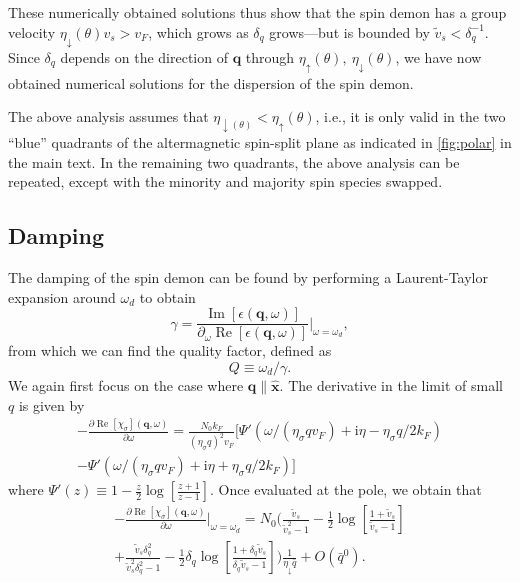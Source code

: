 \documentclass[aps,prb,reprint,twocolumns,superscriptaddress,nofootinbib]{revtex4-2}
\newcommand{\ii}{\mathrm{i}}
\DeclareMathOperator{\Imm}{Im}
\DeclareMathOperator{\Ree}{Re}
\newcommand{\kF}{k_{F}}
\begin{document}
	These numerically obtained solutions thus show that the spin demon has a group velocity $\eta_{\downarrow}(\theta)v_s>v_F$, which grows as $\delta_q$ grows---but is bounded by $\tilde v_s < \delta_q^{-1}$. 
	Since $\delta_q$ depends on the direction of $\bm q$ through $\eta_\uparrow(\theta),\ \eta_\downarrow(\theta)$, we have now obtained numerical solutions for the dispersion of the spin demon. 
	
	The above analysis assumes that $\eta_{\downarrow(\theta)}<\eta_{\uparrow}(\theta)$, i.e., it is only valid in the two ``blue'' quadrants of the altermagnetic spin-split plane as indicated in \cref{fig:polar} in the main text. In the remaining two quadrants, the above analysis can be repeated, except with the minority and majority spin species swapped. 
	
	\subsection{Damping}
	\label{sec:damping}
	The damping of the spin demon can be found by performing a Laurent-Taylor expansion around $\omega_d$ to obtain 
	\begin{equation}
		\gamma = \frac{\Imm[\epsilon(\bm q,\omega)]}{\partial_\omega \Ree[\epsilon(\bm q,\omega)]}\Bigr|_{\omega=\omega_d},
	\end{equation}
	from which we can find the quality factor, defined as 
	\begin{equation}
		Q \equiv \omega_d / \gamma.
	\end{equation}
	We again first focus on the case where $\bm q\parallel\hat{\bm x}$. The derivative in the limit of small $q$ is given by \cite{giulianiQuantumTheoryElectron2005}
	\begin{multline}
		-\frac{\partial\Ree[\chi_\sigma](\bm q,\omega)}{\partial\omega} = \frac{N_0 \kF}{( \eta_\sigma q)^2 v_F} [ \Psi'\left(\omega / (\eta_\sigma q v_F) + \ii \eta - \eta_\sigma q/2\kF \right) 
		\\
		- \Psi'\left(\omega / (\eta_\sigma q v_F) + \ii \eta + \eta_\sigma q/2\kF \right) 
		] 
	\end{multline}
	where $\Psi'(z)\equiv 1- \frac{z}{2}\log\left[\frac{z+1}{z-1}\right]$. 
	Once evaluated at the pole, we obtain that 
	\begin{multline}
		-\frac{\partial\Ree[\chi_\sigma](\bm q,\omega)}{\partial\omega}\Bigr|_{\omega=\omega_d} = 	N_0\Biggl(\frac{\tilde v_s}{\tilde v_s^2 - 1} - \frac{1}{2} \log\left[\frac{1+\tilde v_s}{\tilde v_s-1}\right] \\ 
		+ \frac{\tilde v_s \delta_q^2}{\tilde v_s^2\delta_q^2-1}- \frac{1}{2} \delta_q \log\left[\frac{1+\delta_q\tilde v_s}{\delta_q\tilde v_s-1}\right] \Biggl)\frac{1}{\eta_\downarrow \bar q} +O\left(\bar q^0\right).
	\end{multline}
\end{document}
